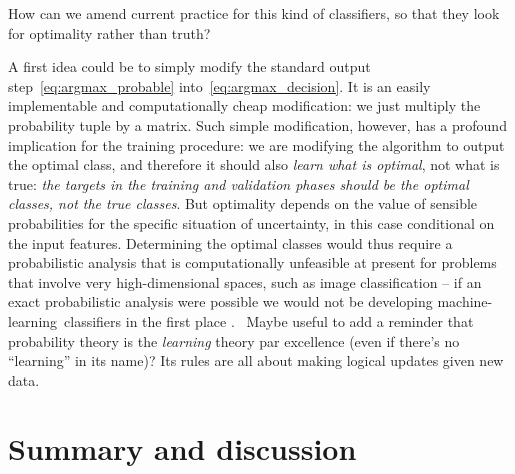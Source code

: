 \documentclass[\ifafour a4paper,12pt,\else a5paper,10pt,\fi%
onecolumn,oneside,article,%
british%
]{memoir}
\makeatletter
\theoremstyle{remark}
\theoremstyle{innote}
\def\sum{\DOTSI\sumop\slimits@}
\newcommand*{\de}{\partialup}%
\newcommand*{\p}{\mathrm{p}}%
\renewcommand*{\|}[1][]{\nonscript\:#1\vert\nonscript\:\mathopen{}}
\newcommand*{\chaps}{chs}%
\newcommand*{\tsum}{\mathop{\textstyle\sum}\nolimits}
\newcommand*{\puzzle}{{\fontencoding{U}\fontfamily{fontawesometwo}\selectfont\symbol{225}}}
\newcommand{\mynoteu}[1]{{\footnotesize\color{notecolour}\puzzle\ #1}}
\newcommand*{\ml}{machine-learning}
\makeatother
\begin{document}
How can we amend current practice for this kind of classifiers, so that they look for optimality rather than truth?

A first idea could be to simply modify the standard output step~\eqref{eq:argmax_probable} into~\eqref{eq:argmax_decision}. It is an easily implementable and computationally cheap modification: we just multiply the probability tuple by a matrix. Such simple modification, however, has a profound implication for the training procedure: we are modifying the algorithm to output the optimal class, and therefore it should also \emph{learn what is optimal}, not what is true: \emph{the targets in the training and validation phases should be the optimal classes, not the true classes}. But optimality depends on the value of sensible probabilities for the specific situation of uncertainty, in this case conditional on the input features. Determining the optimal classes would thus require a probabilistic analysis that is computationally unfeasible at present for problems that involve very high-dimensional spaces, such as image classification -- if an exact probabilistic analysis were possible we would not be developing \ml\ classifiers in the first place \autocites[\chaps~2, 12]{russelletal1995_r2022}{pearl1988}. \mynoteu{Maybe useful to add a reminder that probability theory is the \emph{learning} theory par excellence (even if there's no \enquote{learning} in its name)? Its rules are all about making logical updates given new data.}




\section{Summary and discussion}
\label{sec:summary_discussion}


\clearpage


\end{document}
